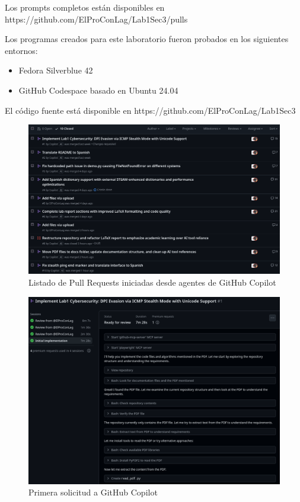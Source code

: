 \documentclass[letter,12pt]{article}
\begin{document}
Los prompts completos están disponibles en https://github.com/ElProConLag/Lab1Sec3/pulls

Los programas creados para este laboratorio fueron probados en los siguientes entornos:
\begin{itemize}
    \item Fedora Silverblue 42
    \item GitHub Codespace basado en Ubuntu 24.04
\end{itemize}
El código fuente está disponible en https://github.com/ElProConLag/Lab1Sec3
\begin{figure}
    \centering
    \includegraphics[width=1\linewidth]{actividades/Captura desde 2025-09-04 23-29-08.png}
    \caption{Listado de Pull Requests iniciadas desde agentes de GitHub Copilot}
    \label{github1}
\end{figure}
\begin{figure}
    \centering
    \includegraphics[width=1\linewidth]{actividades/Captura desde 2025-09-04 23-30-21.png}
    \caption{Primera solicitud a GitHub Copilot}
    \label{github2}
\end{figure}
\end{document}
